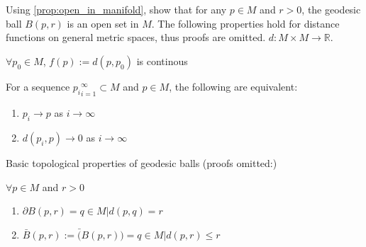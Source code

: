 \begin{problem}
    Using \autoref{prop:open_in_manifold}, show that for any $p \in M$ and $r>0$, the geodesic ball $B(p,r)$ is an open set in $M$.
    The following properties hold for distance functions on general metric spaces, thus proofs are omitted. $d: M \times M \to \mathbb{R}$.
    \begin{proposition}
        $\forall p_0 \in M$, $f(p) := d(p, p_0)$ is continous
    \end{proposition}
    \begin{proposition}
        For a sequence ${p_i}_{i=1}^{\infty} \subset M$ and $p\in M$, the following are equivalent:
        \begin{enumerate}
            \item $p_i \to p$ as $i \to \infty$
            \item $d(p_i, p) \to 0$ as $i \to \infty$
        \end{enumerate}
        Basic topological properties of geodesic balls (proofs omitted:)
    \end{proposition}
    \begin{proposition}
        $\forall p \in M$ and $r>0$
        \begin{enumerate}
            \item $\partial B(p,r) = {q \in M | d(p,q)=r}$
            \item $\bar{B}(p,r) := \bar(B(p,r)) = {q \in M | d(p,r) \leq r}$
        \end{enumerate}
    \end{proposition}
\end{problem}